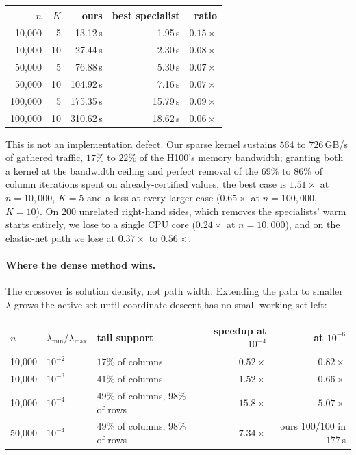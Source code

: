 \documentclass[11pt]{article}
\begin{document}
\begin{center}
\small
\begin{tabular}{rrrrr}
\toprule
$n$ & $K$ & ours & best specialist & ratio \\
\midrule
10{,}000 & 5 & 13.12\,s & 1.95\,s & $0.15\times$ \\
10{,}000 & 10 & 27.44\,s & 2.30\,s & $0.08\times$ \\
50{,}000 & 5 & 76.88\,s & 5.30\,s & $0.07\times$ \\
50{,}000 & 10 & 104.92\,s & 7.16\,s & $0.07\times$ \\
100{,}000 & 5 & 175.35\,s & 15.79\,s & $0.09\times$ \\
100{,}000 & 10 & 310.62\,s & 18.62\,s & $0.06\times$ \\
\bottomrule
\end{tabular}
\end{center}

This is not an implementation defect. Our sparse kernel sustains $564$ to
$726$\,GB/s of gathered traffic, $17\%$ to $22\%$ of the H100's memory
bandwidth; granting both a kernel at the bandwidth ceiling and perfect removal
of the $69\%$ to $86\%$ of column iterations spent on already-certified values,
the best case is $1.51\times$ at $n = 10{,}000$, $K = 5$ and a loss at every
larger case ($0.65\times$ at $n = 100{,}000$, $K = 10$). On $200$ unrelated
right-hand sides, which removes the specialists' warm starts entirely, we lose
to a single CPU core ($0.24\times$ at $n = 10{,}000$), and on the elastic-net
path we lose at $0.37\times$ to $0.56\times$.

\paragraph{Where the dense method wins.}
The crossover is solution density, not path width. Extending the path to
smaller $\lambda$ grows the active set until coordinate descent has no small
working set left:

\begin{center}
\small
\begin{tabular}{lllrr}
\toprule
$n$ & $\lambda_{\min}/\lambda_{\max}$ & tail support & speedup at $10^{-4}$ & at $10^{-6}$ \\
\midrule
10{,}000 & $10^{-2}$ & $17\%$ of columns & $0.52\times$ & $0.82\times$ \\
10{,}000 & $10^{-3}$ & $41\%$ of columns & $1.52\times$ & $0.66\times$ \\
10{,}000 & $10^{-4}$ & $49\%$ of columns, $98\%$ of rows & $15.8\times$ & $5.07\times$ \\
50{,}000 & $10^{-4}$ & $49\%$ of columns, $98\%$ of rows & $7.34\times$ & ours $100$/$100$ in $177$\,s \\
\bottomrule
\end{tabular}
\end{center}
\end{document}
